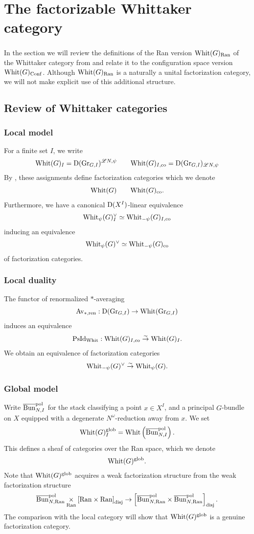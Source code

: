 \section{The factorizable Whittaker category}
\label{section:Ran}

\subsubsection{} In the section we will review the definitions of the Ran version $\mathrm{Whit}(G)_{\mathrm{Ran}}$ of the Whittaker category from \cite{loc_glob_whit} and relate it to the configuration space version $\mathrm{Whit}(G)_{\mathrm{Conf}}$. Although $\mathrm{Whit}(G)_{\mathrm{Ran}}$ is a naturally a unital factorization category, we will not make explicit use of this additional structure.

\subsection{Review of Whittaker categories}

\subsubsection{Local model} For a finite set $I$, we write
    \[\mathrm{Whit}(G)_I = \mathrm{D}(\mathrm{Gr}_{G,I})^{\mathscr{L} N,\psi}  \qquad  \mathrm{Whit}(G)_{I,\mathrm{co}} = \mathrm{D}(\mathrm{Gr}_{G, I})_{\mathscr{L} N, \psi}\]
By \cite[Appendix B]{lin_nearby_cycles}, these assignments define factorization categories which we denote
  \[\mathrm{Whit}(G)  \qquad  \mathrm{Whit}(G)_{\mathrm{co}}.\]
Furthermore, we have a canonical $\mathrm{D}(X^I)$-linear equivalence
  \[\mathrm{Whit}_\psi(G)_I^\vee \simeq \mathrm{Whit}_{-\psi}(G)_{I,\mathrm{co}}\]
inducing an equivalence
  \[\mathrm{Whit}_\psi(G)^\vee \simeq \mathrm{Whit}_{-\psi}(G)_{\mathrm{co}}\]
of factorization categories.

\subsubsection{Local duality} The functor of renormalized $*$-averaging
    \[\mathrm{Av}_{*,\mathrm{ren}} : \mathrm{D}(\mathrm{Gr}_{G,I}) \to \mathrm{Whit}(\mathrm{Gr}_{G,I})\]
induces an equivalence
    \[\mathrm{PsId}_{\mathrm{Whit}} : \mathrm{Whit}(G)_{I,\mathrm{co}} \overset{\sim}{\rightarrow} \mathrm{Whit}(G)_I.\]
We obtain an equivalence of factorization categories
    \[\mathrm{Whit}_{-\psi}(G)^\vee \overset{\sim}{\rightarrow} \mathrm{Whit}_\psi(G).\]

\subsubsection{Global model} Write $\overline{\mathrm{Bun}}_{N,I}^{\mathrm{pol}}$ for the stack classifying a point $x \in X^I$, and a principal $G$-bundle on $X$ equipped with a degenerate $N^\omega$-reduction away from $x$. We set
    \[\mathrm{Whit}(G)_I^{\mathrm{glob}} = \mathrm{Whit}\left(\overline{\mathrm{Bun}}_{N,I}^{\mathrm{pol}} \right).\]
This defines a sheaf of categories over the Ran space, which we denote
    \[\mathrm{Whit}(G)^{\mathrm{glob}}.\]
Note that $\mathrm{Whit}(G)^{\mathrm{glob}}$ acquires a weak factorization structure from the weak factorization structure
  \[\overline{\mathrm{Bun}}_{N,\mathrm{Ran}}^{\mathrm{pol}} \underset{\mathrm{Ran}}{\times} \left[ \mathrm{Ran} \times \mathrm{Ran} \right]_{\mathrm{disj}} \to \left[ \overline{\mathrm{Bun}}_{N,\mathrm{Ran}}^{\mathrm{pol}} \times \overline{\mathrm{Bun}}_{N,\mathrm{Ran}}^{\mathrm{pol}} \right]_{\mathrm{disj}}.\]
The comparison with the local category will show that $\mathrm{Whit}(G)^{\mathrm{glob}}$ is a genuine factorization category.

